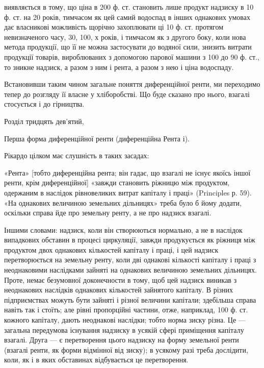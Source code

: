 \parcont{}  %
виявляється в тому, що ціна в 200 ф. ст. становить лише продукт надзиску
в 10 ф. ст. на 20 років, тимчасом як цей самий водоспад в інших однакових
умовах дає власникові можливість щорічно захоплювати ці 10 ф. ст. протягом
невизначеного часу, 30, 100, х років, і тимчасом як з другого боку, коли нова
метода продукції, що її не можна застосувати до водяної сили, знизить витрати
продукції товарів, вироблюваних з допомогою парової машини з 100 до 90 ф. ст.,
то зникне надзиск, а разом з ним і рента, а разом з нею і ціна водоспаду.

Встановивши таким чином загальне поняття диференційної ренти, ми переходимо
тепер до розгляду її власне у хліборобстві. Що буде сказано про нього,
взагалі стосується і до гірництва.

Розділ тридцять дев’ятий,

Перша форма диференційної ренти (диференційна
Рента і).

Рікардо цілком має слушність в таких засадах:

«Рента» [тобто диференційна рента; він гадає, що взагалі не існує якоїсь
іншої ренти, крім диференційної] «завжди становить ріжницю між продуктом,
одержаним в наслідок рівновеликих витрат капіталу і праці» (Principles р. 59).
«На однакових величиною земельних дільницях» треба було б йому додати,
оскільки справа йде про земельну ренту, а не про надзиск взагалі.

Іншими словами: надзиск, коли він створюються нормально, а не в наслідок
випадкових обставин в процесі циркуляції, завжди продукується як ріжниця
між продуктом двох однакових кількостей капіталу і праці, і цей надзиск перетворюється
на земельну ренту, коли дві однакові кількості капіталу і праці з
неоднаковими наслідками зайняті на однакових величиною земельних дільницях.
Проте, немає безумовної доконечности в тому, щоб цей надзиск виникав з
неоднакових наслідків однакових кількостей зайнятого капіталу. В різних
підприємствах можуть бути зайняті і різної величини капітали; здебільша справа
навіть так і стоїть; але рівні пропорційні частини, отже, наприклад, 100 ф. ст. кожного
капіталу, дають неоднакові наслідки; тобто норма зиску різна. Це — загальна
передумова існування надзиску в усякій сфері приміщення капіталу взагалі.
Друга — є перетворення цього надзиску на форму земельної ренти (взагалі ренти,
як форми відмінної від зиску); в усякому разі треба дослідити, коли, як і в
яких обставинах відбувається це перетворення.

